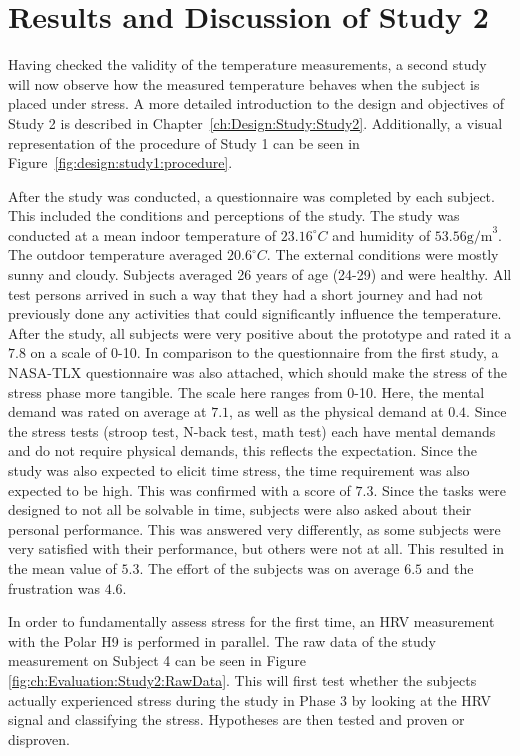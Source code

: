 \clearpage
\section{Results and Discussion of Study 2}
\label{sec:Evaluation:Study2}
Having checked the validity of the temperature measurements, a second study will now observe how the measured temperature behaves when the subject is placed under stress.
A more detailed introduction to the design and objectives of Study 2 is described in Chapter~\ref{ch:Design:Study:Study2}.
Additionally, a visual representation of the procedure of Study 1 can be seen in Figure~\ref{fig:design:study1:procedure}.

After the study was conducted, a questionnaire was completed by each subject. 
This included the conditions and perceptions of the study. 
The study was conducted at a mean indoor temperature of $23.16 ^\circ C$ and humidity of $53.56 \text{g/m}^3$. 
The outdoor temperature averaged $20.6 ^\circ C$.
The external conditions were mostly sunny and cloudy.
Subjects averaged 26 years of age (24-29) and were healthy.
All test persons arrived in such a way that they had a short journey and had not previously done any activities that could significantly influence the temperature.
After the study, all subjects were very positive about the prototype and rated it a $7.8$ on a scale of 0-10.
In comparison to the questionnaire from the first study, a NASA-TLX questionnaire was also attached, which should make the stress of the stress phase more tangible.
The scale here ranges from 0-10.
Here, the mental demand was rated on average at $7.1$, as well as the physical demand at $0.4$. 
Since the stress tests (stroop test, N-back test, math test) each have mental demands and do not require physical demands, this reflects the expectation.
Since the study was also expected to elicit time stress, the time requirement was also expected to be high.
This was confirmed with a score of $7.3$.
Since the tasks were designed to not all be solvable in time, subjects were also asked about their personal performance.
This was answered very differently, as some subjects were very satisfied with their performance, but others were not at all. 
This resulted in the mean value of $5.3$.
The effort of the subjects was on average $6.5$ and the frustration was $4.6$.

In order to fundamentally assess stress for the first time, an HRV measurement with the Polar H9 is performed in parallel.
The raw data of the study measurement on Subject 4 can be seen in Figure \ref{fig:ch:Evaluation:Study2:RawData}.
This will first test whether the subjects actually experienced stress during the study in Phase 3 by looking at the HRV signal and classifying the stress.
Hypotheses are then tested and proven or disproven.

